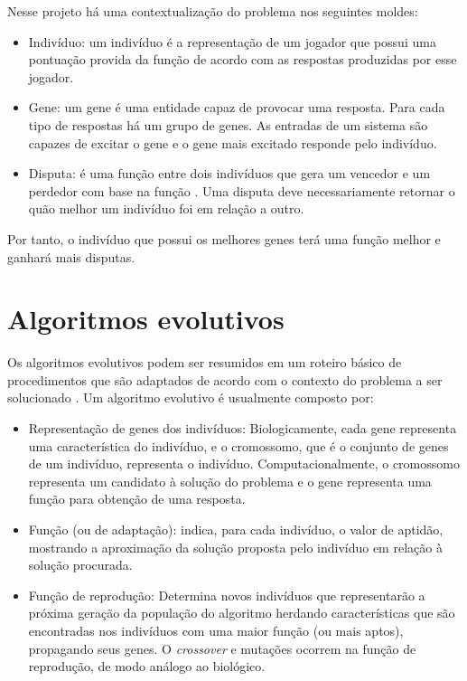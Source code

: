 Nesse projeto há uma contextualização do problema nos seguintes moldes:

\begin{itemize}
    \item Indivíduo: um indivíduo é a representação de um jogador que possui uma pontuação provida da função \fitness de acordo com as respostas produzidas por esse jogador.
    \item Gene: um gene é uma entidade capaz de provocar uma resposta. Para cada tipo de respostas há um grupo de genes. As entradas de um sistema são capazes de excitar o gene e o gene mais excitado responde pelo indivíduo.
    \item Disputa: é uma função entre dois indivíduos que gera um vencedor e um perdedor com base na função \fitness. Uma disputa deve necessariamente retornar o quão melhor um indivíduo foi em relação a outro.
\end{itemize}

Por tanto, o indivíduo que possui os melhores genes terá uma função \fitness melhor e ganhará mais disputas.

\section{Algoritmos evolutivos}
Os algoritmos evolutivos podem ser resumidos em um roteiro básico de procedimentos \cite{Todd1997} que são adaptados de acordo com o contexto do problema a ser solucionado \cite{Werger1999} \cite{Mitchell1995}. Um algoritmo evolutivo é usualmente composto por:

\newcommand{\crossover}{\textit{crossover}\xspace}

\begin{itemize}
    \item Representação de genes dos indivíduos: Biologicamente, cada gene representa uma característica do indivíduo, e o cromossomo, que é o conjunto de genes de um indivíduo, representa o indivíduo. Computacionalmente, o cromossomo representa um candidato à solução do problema e o gene representa uma função para obtenção de uma resposta.
    \item Função \fitness (ou de adaptação): indica, para cada indivíduo, o valor de aptidão, mostrando a aproximação da solução proposta pelo indivíduo em relação à solução procurada.
    \item Função de reprodução: Determina novos indivíduos que representarão a próxima geração da população do algoritmo herdando características que são encontradas nos indivíduos com uma maior função \fitness (ou mais aptos), propagando seus genes. O \crossover e mutações ocorrem na função de reprodução, de modo análogo ao biológico.
\end{itemize}

